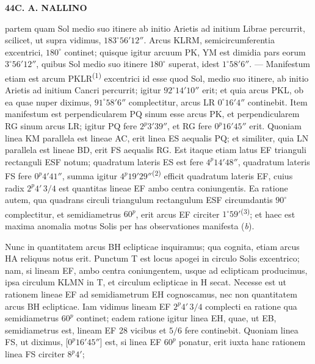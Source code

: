 \documentclass[10pt]{article}
\newcommand{\A}[1]{\hypertarget{#1}{}}
\newcommand{\NM}[1]{\textsuperscript{(#1)}}
\newcommand{\SP}[3]{%
  \clearpage
  \A{AB01-PDF#1}%
  \begin{center}\textbf{#2\quad #3}\end{center}%
}
\begin{document}

\SP{0133}{44}{C. A. NALLINO}

\A{AB01-PDF0133-P01}
partem quam Sol medio suo itinere ab initio Arietis ad initium
Librae percurrit, scilicet, ut supra vidimus,
$183^\circ56'12''$. Arcus KLRM, semicircumferentia excentrici,
$180^\circ$ continet; quisque igitur arcuum PK, YM est dimidia
pars eorum $3^\circ56'12''$, quibus Sol medio suo itinere
$180^\circ$ superat, idest $1^\circ58'6''$. — Manifestum etiam
est arcum PKLR\NM{1} excentrici id esse quod Sol, medio suo
itinere, ab initio Arietis ad initium Cancri percurrit; igitur
$92^\circ14'10''$ erit; et quia arcus PKL, ob ea quae nuper
diximus, $91^\circ58'6''$ complectitur, arcus LR $0^\circ16'4''$
continebit. Item manifestum est perpendicularem PQ sinum esse
arcus PK, et perpendicularem RG sinum arcus LR; igitur PQ fere
$2^{p}3'39''$, et RG fere $0^{p}16'45''$ erit. Quoniam linea KM
parallela est lineae AC, erit linea ES aequalis PQ; et similiter,
quia LN parallela est lineae BD, erit FS aequalis RG. Est itaque
etiam latus EF trianguli rectanguli ESF notum; quadratum lateris
ES est fere $4^{p}14'48''$, quadratum lateris FS fere
$0^{p}4'41''$, summa igitur $4^{p}19'29''$\NM{2} efficit quadratum
lateris EF, cuius radix $2^{p}4'\,3/4$ est quantitas lineae EF
ambo centra coniungentis. Ea ratione autem, qua quadrans circuli
triangulum rectangulum ESF circumdantis $90^\circ$ complectitur,
et semidiametrus $60^{p}$, erit arcus EF circiter
$1^\circ59'$\NM{3}; et haec est maxima anomalia motus Solis per
has observationes manifesta ({\itshape b}).

\A{AB01-PDF0133-P02}
Nunc in quantitatem arcus BH eclipticae inquiramus; qua cognita,
etiam arcus HA reliquus notus erit. Punctum T est locus apogei in
circulo Solis excentrico; nam, si lineam EF, ambo centra
coniungentem, usque ad eclipticam producimus, ipsa circulum KLMN
in T, et circulum eclipticae in H secat. Necesse est ut rationem
lineae EF ad semidiametrum EH cognoscamus, nec non quantitatem
arcus BH eclipticae. Iam vidimus lineam EF $2^{p}4'\,3/4$
complecti ea ratione qua semidiametrus $60^{p}$ continet; eadem
ratione igitur linea EH, quae, ut EB, semidiametrus est, lineam
EF 28 vicibus et $5/6$ fere continebit. Quoniam linea FS, ut
diximus, [$0^{p}16'45''$] est, si linea EF $60^{p}$ ponatur,
erit iuxta hanc rationem linea FS circiter $8^{p}4'$;
\end{document}
